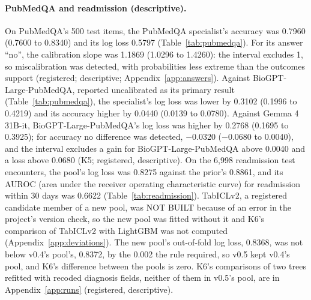 \documentclass[11pt,letterpaper]{article}
\begin{document}
\paragraph{PubMedQA and readmission (descriptive).} On PubMedQA's 500 test items, the PubMedQA specialist's accuracy was 0.7960 (0.7600 to 0.8340) and its log loss 0.5797 (Table~\ref{tab:pubmedqa}). For its answer ``no'', the calibration slope was 1.1869 (1.0296 to 1.4260): the interval excludes 1, so miscalibration was detected, with probabilities less extreme than the outcomes support (registered; descriptive; Appendix~\ref{app:answers}). Against BioGPT-Large-PubMedQA, reported uncalibrated as its primary result (Table~\ref{tab:pubmedqa}), the specialist's log loss was lower by 0.3102 (0.1996 to 0.4219) and its accuracy higher by 0.0440 (0.0139 to 0.0780). Against Gemma 4 31B-it, BioGPT-Large-PubMedQA's log loss was higher by 0.2768 (0.1695 to 0.3925); for accuracy no difference was detected, $-$0.0320 ($-$0.0680 to 0.0040), and the interval excludes a gain for BioGPT-Large-PubMedQA above 0.0040 and a loss above 0.0680 (K5; registered, descriptive). On the 6,998 readmission test encounters, the pool's log loss was 0.8275 against the prior's 0.8861, and its AUROC (area under the receiver operating characteristic curve) for readmission within 30 days was 0.6622 (Table~\ref{tab:readmission}). TabICLv2, a registered candidate member of a new pool, was NOT BUILT because of an error in the project's version check, so the new pool was fitted without it and K6's comparison of TabICLv2 with LightGBM \citep{ke2017} was not computed (Appendix~\ref{app:deviations}). The new pool's out-of-fold log loss, 0.8368, was not below v0.4's pool's, 0.8372, by the 0.002 the rule required, so v0.5 kept v0.4's pool, and K6's difference between the pools is zero. K6's comparisons of two trees refitted with recoded diagnosis fields, neither of them in v0.5's pool, are in Appendix~\ref{app:runs} (registered, descriptive).

\begin{table}[t]
\centering\footnotesize
\caption{PubMedQA, the 500 expert-labeled test items (descriptive: this test split was read in the evaluation of every version). Each cell gives the estimate and its 95 percent interval from 1,000 item resamples; ECE is the expected calibration error. BioGPT-Large-PubMedQA was fine-tuned on sets that hold all 150 validation items, so its uncalibrated probabilities are its primary result and its calibration on those items is secondary.}
\label{tab:pubmedqa}

\end{table}
\end{document}
